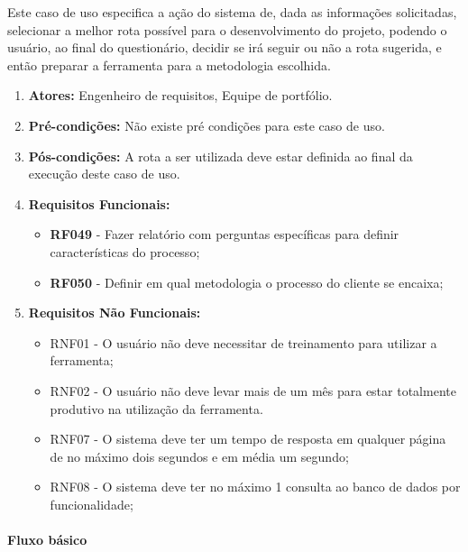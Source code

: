 Este caso de uso especifica a ação do sistema de, dada as informações solicitadas, selecionar a melhor rota possível para o desenvolvimento do projeto, podendo o usuário, ao final do questionário, decidir se irá seguir ou não a rota sugerida, e então preparar a ferramenta para a metodologia escolhida.

\begin{enumerate}
	\item \textbf{Atores:}
		Engenheiro de requisitos, Equipe de portfólio. 
	\item \textbf{Pré-condições:}
		Não existe pré condições para este caso de uso.
	\item \textbf{Pós-condições:}
		A rota a ser utilizada deve estar definida ao final da execução deste caso de uso.
	\item \textbf{Requisitos Funcionais:}
		\begin{itemize}
			\item \textbf{RF049} - Fazer relatório com perguntas específicas para definir características do processo;
			\item \textbf{RF050} - Definir em qual metodologia o processo do cliente se encaixa;
		\end{itemize}
	\item \textbf{Requisitos Não Funcionais:}
		\begin{itemize}
			\item RNF01 - O usuário não deve necessitar de treinamento para utilizar a ferramenta;
			\item RNF02 - O usuário não deve levar mais de um mês para estar totalmente produtivo na utilização da ferramenta.
			\item RNF07 - O sistema deve ter um tempo de resposta em qualquer página de no máximo dois segundos e em média um segundo;
			\item RNF08 - O sistema deve ter no máximo 1 consulta ao banco de dados por funcionalidade;
		\end{itemize}
\end{enumerate}

\paragraph{Fluxo básico}

